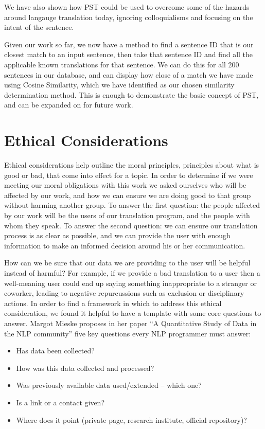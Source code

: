 \documentclass[runningheads]{llncs}
\begin{document}
	We have also shown how PST could be used to overcome some of the hazards around langauge translation today, ignoring colloquialisms and focusing on the intent of the sentence.

	Given our work so far, we now have a method to find a sentence ID that is our closest match to an input sentence, then take that sentence ID and find all the applicable known translations for that sentence. We can do this for all 200 sentences in our database, and can display how close of a match we have made using Cosine Similarity, which we have identified as our chosen similarity determination method. This is enough to demonstrate the basic concept of PST, and can be expanded on for future work.

	\section{Ethical Considerations}
	Ethical considerations help outline the moral principles, principles about what is good or bad, that come into effect for a topic. In order to determine if we were meeting our moral obligations with this work we asked ourselves who will be affected by our work, and how we can ensure we are doing good to that group without harming another group. To answer the first question: the people affected by our work will be the users of our translation program, and the people with whom they speak. To answer the second question: we can ensure our translation process is as clear as possible, and we can provide the user with enough information to make an informed decision around his or her communication. 

	How can we be sure that our data we are providing to the user will be helpful instead of harmful? For example, if we provide a bad translation to a user then a well-meaning user could end up saying something inappropriate to a stranger or coworker, leading to negative repurcussions such as exclusion or disciplinary actions. In order to find a framework in which to address this ethical consideration, we found it helpful to have a template with some core questions to answer. Margot Mieske proposes in her paper ``A Quantitative Study of Data in the NLP community'' five key questions every NLP programmer must answer: ~\cite{ref_url8}


	\begin{table} 
		\begin{center}
			\begin{itemize}
				\item Has data been collected? 
				\item How was this data collected and processed? 
			 	\item Was previously available data used/extended – which one? 
				\item Is a link or a contact given? 
				\item Where does it point (private page, research institute, official repository)?
			\end{itemize}
		\end{center}
		\label{List: Ethical Questions}
	\end{table}
\end{document}
